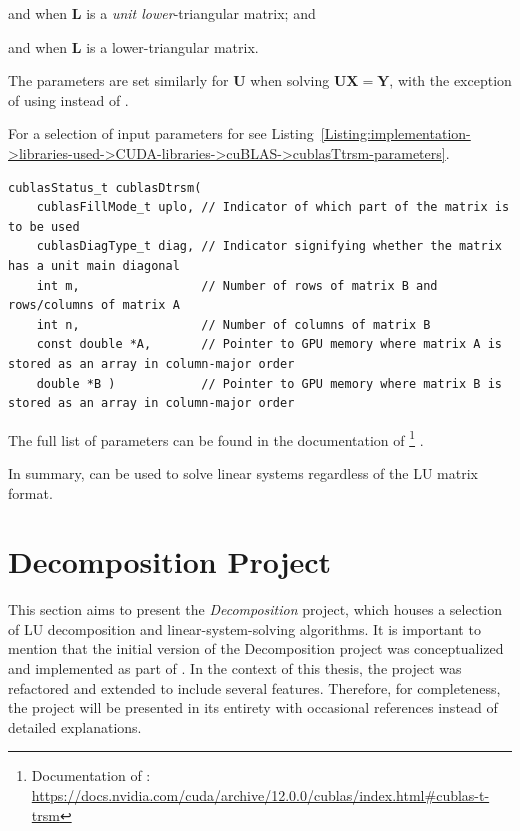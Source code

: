 \begin{tight_itemize}
	\item {} and  when $\mathbf{L}$ is a \textit{unit lower}-triangular matrix; and
	\item {} and  when $\mathbf{L}$ is a lower-triangular matrix.
\end{tight_itemize}

The parameters are set similarly for $\mathbf{U}$ when solving $\mathbf{UX}=\mathbf{Y}$, with the exception of using  instead of .

For a selection of input parameters for  see Listing~\ref{Listing:implementation->libraries-used->CUDA-libraries->cuBLAS->cublasTtrsm-parameters}.

\begin{lstlisting}[caption={The function declaration of \code{cublasDtrsm()} with a selection of parameters.},label={Listing:implementation->libraries-used->CUDA-libraries->cuBLAS->cublasTtrsm-parameters}]
cublasStatus_t cublasDtrsm(
	cublasFillMode_t uplo, // Indicator of which part of the matrix is to be used
	cublasDiagType_t diag, // Indicator signifying whether the matrix has a unit main diagonal
	int m,                 // Number of rows of matrix B and rows/columns of matrix A
	int n,                 // Number of columns of matrix B
	const double *A,       // Pointer to GPU memory where matrix A is stored as an array in column-major order
	double *B )            // Pointer to GPU memory where matrix B is stored as an array in column-major order
\end{lstlisting}

The full list of parameters can be found in the documentation of \footnote{Documentation of : \url{https://docs.nvidia.com/cuda/archive/12.0.0/cublas/index.html\#cublas-t-trsm}} \cite{h9oJtLLHaTFaL3ME}.

In summary,  can be used to solve linear systems regardless of the LU matrix format.




\section{Decomposition Project}\label{Section:implementation->decomposition-project}
This section aims to present the \textit{Decomposition} project,  which houses a selection of LU decomposition and linear-system-solving algorithms.
It is important to mention that the initial version of the Decomposition project was conceptualized and implemented as part of  \cite{Cejka2022}.
In the context of this thesis, the project was refactored and extended to include several features.
Therefore, for completeness, the project will be presented in its entirety with occasional references instead of detailed explanations.

